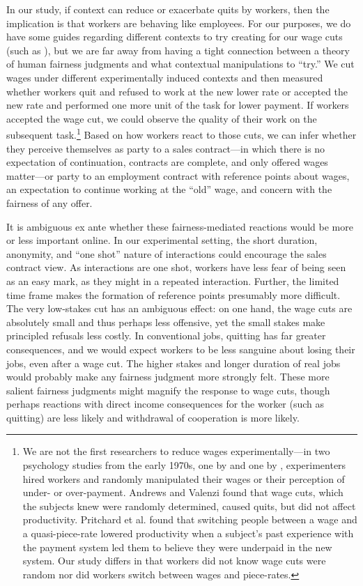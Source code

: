 \documentclass[11pt]{article}
\begin{document}
In our study, if context can reduce or exacerbate quits by workers, then the implication is that workers are behaving like employees.
For our purposes, we do have some guides regarding different contexts to try creating for our wage cuts (such as \cite{kahneman1986}), but we are far away from having a tight connection between a theory of human fairness judgments and what contextual manipulations to ``try.'' 
We cut wages under different experimentally induced contexts and then measured whether workers quit and refused to work at the new lower rate or accepted the new rate and performed one more unit of the task for lower payment. 
If workers accepted the wage cut, we could observe the quality of their work on the subsequent task.\footnote{
We are not the first researchers to reduce wages experimentally---in two psychology studies from the early 1970s, one by \cite{pritchard1972effects} and one by \cite{valenzi1971effect}, experimenters hired workers and randomly manipulated their wages or their perception of under- or over-payment. 
Andrews and Valenzi found that wage cuts, which the subjects knew were randomly determined, caused quits, but did not affect productivity.  
Pritchard et al. found that switching people between a wage and a quasi-piece-rate lowered productivity when a subject's past experience with the payment system led them to believe they were underpaid in the new system.
Our study differs in that workers did not know wage cuts were random nor did workers switch between wages and piece-rates.
}
Based on how workers react to those cuts, we can infer whether they perceive themselves as party to a sales contract---in which there is no expectation of continuation, contracts are complete, and only offered wages matter---or party to an employment contract with reference points about wages, an expectation to continue working at the ``old'' wage, and concern with the fairness of any offer.

It is ambiguous ex ante whether these fairness-mediated reactions would be more or less important online. 
In our experimental setting, the short duration, anonymity, and ``one shot'' nature of interactions could encourage the sales contract view. 
As interactions are one shot, workers have less fear of being seen as an easy mark, as they might in a repeated interaction. 
Further, the limited time frame makes the formation of reference points presumably more difficult. 
The very low-stakes cut has an ambiguous effect: 
on one hand, the wage cuts are absolutely small and thus perhaps less offensive, yet the small stakes make principled refusals less costly. 
In conventional jobs, quitting has far greater consequences, and we would expect workers to be less sanguine about losing their jobs, even after a wage cut. 
The higher stakes and longer duration of real jobs would probably make any fairness judgment more strongly felt. 
These more salient fairness judgments might magnify the response to wage cuts, though perhaps reactions with direct income consequences for the worker (such as quitting) are less likely and withdrawal of cooperation is more likely.
\end{document}

